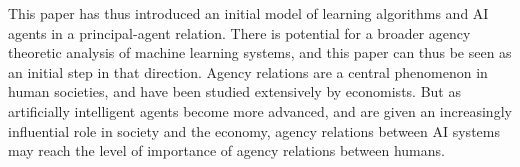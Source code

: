 This paper has thus introduced an initial model of learning algorithms and AI agents in a principal-agent relation. There is potential for a broader agency theoretic analysis of machine learning systems, and this paper can thus be seen as an initial step in that direction. Agency relations are a central phenomenon in human societies, and have been studied extensively by economists. But as artificially intelligent agents become more advanced, and are given an increasingly influential role in society and the economy, agency relations between AI systems may reach the level of importance of agency relations between humans. %


